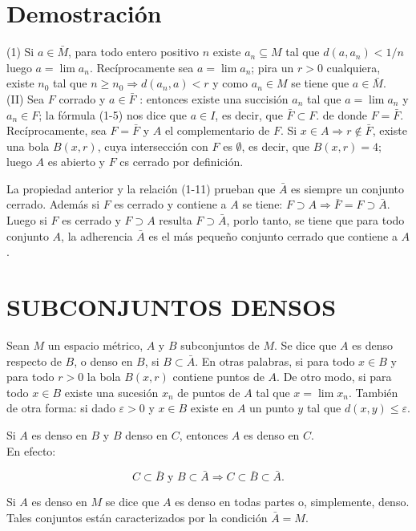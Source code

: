 \documentclass[10pt]{article}
\theoremstyle{plain}
\theoremstyle{definition}
\theoremstyle{remark}
\begin{document}
\section*{Demostración}
(1) Si $a \in \bar{M}$, para todo entero positivo $n$ existe $a_{n} \subseteq M$ tal que $d\left(a, a_{n}\right)<1 / n$ luego $a=\lim a_{n}$. Recíprocamente sea $a=\lim a_{n}$; pira un $r>0$ cualquiera, existe $n_{0}$ tal que $n \geqslant n_{0} \Rightarrow d\left(a_{n}, a\right)<r$ y como $a_{n} \in M$ se tiene que $a \in \bar{M}$.\\
(II) Sea $F$ corrado y $a \in \bar{F}$ : entonces existe una succisión $a_{n}$ tal que $a=\lim a_{n}$ y $a_{n} \in F$; la fórmula (1-5) nos dice que $a \in I$, es decir, que $\bar{F} \subset F$. de donde $F=\bar{F}$. Recíprocamente, sea $F=\bar{F}$ y $A$ el complementario de $F$. Si $x \in A \Rightarrow r \notin \bar{F}$, existe una bola $B(x, r)$, cuya intersección con $F$ es $\emptyset$, es decir, que $B(x, r)=4$; luego $A$ es abierto y $F$ cs cerrado por definición.

La propiedad anterior y la relación (1-11) prueban que $\bar{A}$ es siempre un conjunto cerrado. Además si $F$ es cerrado y contiene a $A$ se tiene: $F \supset A \Rightarrow \bar{F}=F \supset \bar{A}$. Luego si $F$ es cerrado y $F \supset A$ resulta $F \supset \bar{A}$, porlo tanto, se tiene que para todo conjunto $A$, la adherencia $\bar{A}$ es el más pequeño conjunto cerrado que contiene a $A$.

\section*{SUBCONJUNTOS DENSOS}
Sean $M$ un espacio métrico, $A$ y $B$ subconjuntos de $M$. Se dice que $A$ es denso respecto de $B$, o denso en $B$, si $B \subset \bar{A}$. En otras palabras, si para todo $x \in B$ y para todo $r>0$ la bola $B(x, r)$ contiene puntos de $A$. De otro modo, si para todo $x \in B$ existe una sucesión $x_{n}$ de puntos de $A$ tal que $x=\lim x_{n}$. También de otra forma: si dado $\varepsilon>0$ y $x \in B$ existe en $A$ un punto $y$ tal que $d(x, y) \leqslant \varepsilon$.

Si $A$ es denso en $B$ y $B$ denso en $C$, entonces $A$ es denso en $C$.\\
En efecto:

$$
C \subset \bar{B} \text { y } B \subset \bar{A} \Rightarrow C \subset \bar{B} \subset \bar{A} .
$$

Si $A$ es denso en $M$ se dice que $A$ es denso en todas partes o, simplemente, denso. Tales conjuntos están caracterizados por la condición $\bar{A}=M$.
\end{document}
